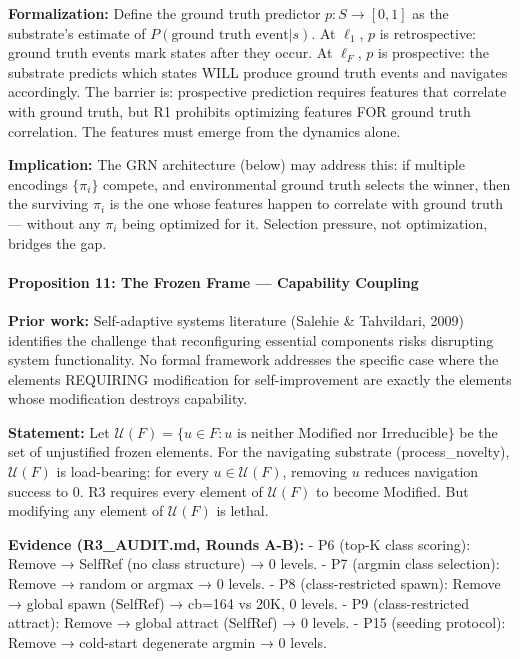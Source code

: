 \documentclass[
  11pt,
]{article}
\begin{document}
\textbf{Formalization:} Define the ground truth predictor
\(p: S \to [0,1]\) as the substrate's estimate of
\(P(\text{ground truth event} | s)\). At \(\ell_1\), \(p\) is
retrospective: ground truth events mark states after they occur. At
\(\ell_F\), \(p\) is prospective: the substrate predicts which states
WILL produce ground truth events and navigates accordingly. The barrier
is: prospective prediction requires features that correlate with ground
truth, but R1 prohibits optimizing features FOR ground truth
correlation. The features must emerge from the dynamics alone.

\textbf{Implication:} The GRN architecture (below) may address this: if
multiple encodings \(\{\pi_i\}\) compete, and environmental ground truth
selects the winner, then the surviving \(\pi_i\) is the one whose
features happen to correlate with ground truth --- without any \(\pi_i\)
being optimized for it. Selection pressure, not optimization, bridges
the gap.

\paragraph{Proposition 11: The Frozen Frame --- Capability
Coupling}\label{proposition-11-the-frozen-frame-capability-coupling}

\textbf{Prior work:} Self-adaptive systems literature (Salehie \&
Tahvildari, 2009) identifies the challenge that reconfiguring essential
components risks disrupting system functionality. No formal framework
addresses the specific case where the elements REQUIRING modification
for self-improvement are exactly the elements whose modification
destroys capability.

\textbf{Statement:} Let
\(\mathcal{U}(F) = \{u \in F : u \text{ is neither Modified nor Irreducible}\}\)
be the set of unjustified frozen elements. For the navigating substrate
(process\_novelty), \(\mathcal{U}(F)\) is load-bearing: for every
\(u \in \mathcal{U}(F)\), removing \(u\) reduces navigation success to
0. R3 requires every element of \(\mathcal{U}(F)\) to become Modified.
But modifying any element of \(\mathcal{U}(F)\) is lethal.

\textbf{Evidence (R3\_AUDIT.md, Rounds A-B):} - P6 (top-K class
scoring): Remove → SelfRef (no class structure) → 0 levels. - P7 (argmin
class selection): Remove → random or argmax → 0 levels. - P8
(class-restricted spawn): Remove → global spawn (SelfRef) → cb=164 vs
20K, 0 levels. - P9 (class-restricted attract): Remove → global attract
(SelfRef) → 0 levels. - P15 (seeding protocol): Remove → cold-start
degenerate argmin → 0 levels.
\end{document}
